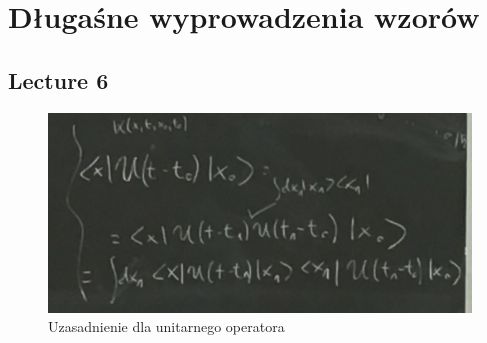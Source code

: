 \documentclass[12pt,a4paper]{report}
\begin{document}
\appendix
\setcounter{table}{0}
\captionsetup[table]{name=Załącznik}
\captionsetup[figure]{name=Załącznik}
\captionsetup[section]{name=Lecture}

\chapter{Długaśne wyprowadzenia wzorów}

\section{Lecture 6}

\begin{figure}[!ht]
        \centering
        \includegraphics[width=\linewidth]{App_6_Rys_1.JPG}
        \caption{Uzasadnienie dla unitarnego operatora}
        \label{fig:app_6:unitarny}
\end{figure}
\end{document}

